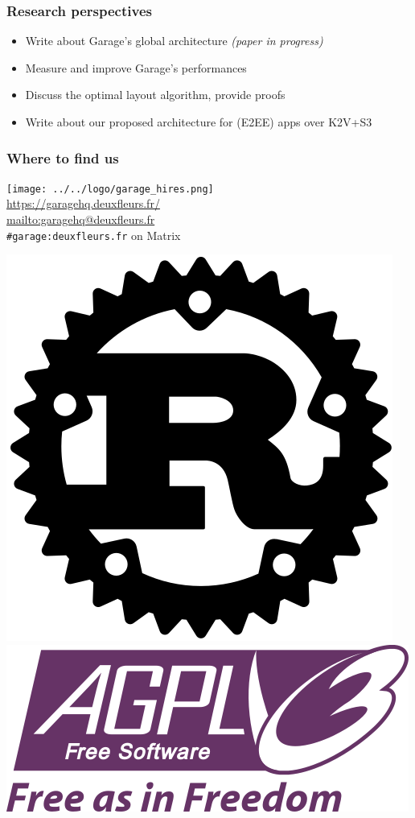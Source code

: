 \documentclass[aspectratio=169]{beamer}
\begin{document}
\begin{frame}
	\frametitle{Research perspectives}
	\begin{itemize}
		\item Write about Garage's global architecture \emph{(paper in progress)}
			\vspace{1em}
		\item Measure and improve Garage's performances
			\vspace{1em}
		\item Discuss the optimal layout algorithm, provide proofs
			\vspace{1em}
		\item Write about our proposed architecture for (E2EE) apps over K2V+S3
	\end{itemize}
\end{frame}

\begin{frame}
	\frametitle{Where to find us}
	\begin{center}
			\texttt{[image: ../../logo/garage\_hires.png]}\\
			\vspace{-1em}
		\url{https://garagehq.deuxfleurs.fr/}\\
		\url{mailto:garagehq@deuxfleurs.fr}\\
		\texttt{\#garage:deuxfleurs.fr} on Matrix

		\vspace{1.5em}
			\includegraphics[width=.06\linewidth]{assets/rust_logo.png}
			\includegraphics[width=.13\linewidth]{assets/AGPLv3_Logo.png}
	\end{center}
\end{frame}
\end{document}
